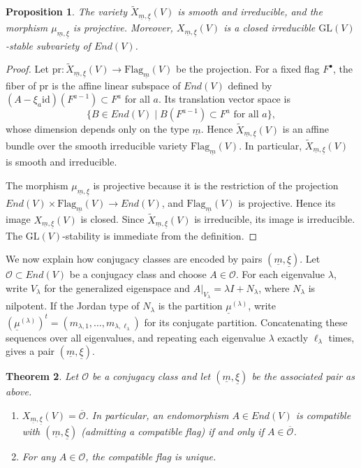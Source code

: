 \documentclass[11pt]{amsart}
\theoremstyle{plain}
\newtheorem{theorem}{Theorem}[section]
\newtheorem{proposition}[theorem]{Proposition}
\theoremstyle{definition}
\theoremstyle{remark}
\newcommand{\GL}{\mathrm{GL}}
\newcommand{\Flag}{\mathrm{Flag}}
\newcommand{\cO}{\mathcal O}
\def\uxi{{\underline{\xi}}}
\def\um{{\underline{m}}}
\begin{document}
\begin{proposition}\label{prop:X-closed-irreducible}
	The variety $\widetilde X_{\um,\uxi}(V)$ is smooth and irreducible, and the morphism
	$\mu_{\um,\uxi}$ is projective. Moreover, $X_{\um,\uxi}(V)$ is a closed irreducible
	$\GL(V)$-stable subvariety of $End(V)$.
\end{proposition}

\begin{proof}
  Let $\mathrm{pr}:\widetilde X_{\um,\uxi}(V)\to \Flag_{\um}(V)$ be the projection.
    For a fixed flag $F^\bullet$, the fiber of $\mathrm{pr}$ is the affine linear subspace
    of $End(V)$ defined by
    $(A-\xi_a\mathrm{id})(F^{a-1})\subset F^{a}$ for all $a$. Its translation
    vector space is
    \[
    \{B\in End(V)\mid B(F^{a-1})\subset F^a\text{ for all }a\},
    \]
    whose dimension depends only on the type $\um$. Hence
    $\widetilde X_{\um,\uxi}(V)$ is an affine bundle over the smooth irreducible
    variety $\Flag_{\um}(V)$. In particular, $\widetilde X_{\um,\uxi}(V)$ is smooth
    and irreducible.

    The morphism $\mu_{\um,\uxi}$ is projective because it is the restriction of
    the projection $End(V)\times \Flag_{\um}(V)\to End(V)$, and
    $\Flag_{\um}(V)$ is projective. Hence its image
    $X_{\um,\uxi}(V)$ is closed. Since $\widetilde X_{\um,\uxi}(V)$ is irreducible,
    its image is irreducible. The $\GL(V)$-stability is immediate from the
    definition.
\end{proof}

We now explain how conjugacy classes are encoded by pairs $(\um,\uxi)$. Let
$\mathcal O\subset End(V)$ be a conjugacy class and choose $A\in\mathcal O$. For
each eigenvalue $\lambda$, write $V_\lambda$ for the generalized eigenspace and
$A|_{V_\lambda}=\lambda I+N_\lambda$, where $N_\lambda$ is nilpotent. If the
Jordan type of $N_\lambda$ is the partition $\underline{\mu}^{(\lambda)}$, write
$(\underline{\mu}^{(\lambda)})^t=(m_{\lambda,1},\ldots,m_{\lambda,\ell_\lambda})$ for its
conjugate partition. Concatenating these sequences over all eigenvalues, and
repeating each eigenvalue $\lambda$ exactly $\ell_\lambda$ times, gives a pair
$(\um,\uxi)$.
\begin{theorem}\label{thm:orbit-correspondence}
    Let $\cO$ be a conjugacy class and let $(\um, \uxi)$ be the associated pair as above. 
    \begin{enumerate}
        \item $X_{\um,\uxi}(V)=\overline{\mathcal O}$. In particular, an endomorphism $A\in End(V)$ is compatible with $(\um,\uxi)$ (admitting a compatible flag)
    if and only if $A\in \overline{\mathcal O}$.
        \item For any $A\in \cO$, the compatible flag is unique.
    \end{enumerate}
\end{theorem}
\end{document}
